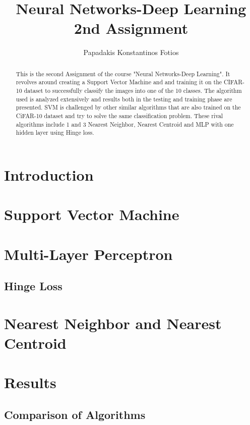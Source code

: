 \documentclass[lettersize,journal]{IEEEtran}
\begin{document}
\title{Neural Networks-Deep Learning \\ 2nd Assignment}
\author{Papadakis Konstantinos Fotios}
\maketitle

\begin{abstract}
This is the second Assignment of the course "Neural Networks-Deep Learning". It revolves around
creating a Support Vector Machine and and training it on the CIFAR-10 dataset to successfully 
classify the images into one of the 10 classes. The algorithm used is analyzed extensively and
results both in the testing and training phase are presented. SVM is challenged by other similar
algorithms that are also trained on the CiFAR-10 dataset and try to solve the same classification 
problem. These rival algorithms include 1 and 3 Nearest Neighbor, Nearest Centroid and MLP with
one hidden layer using Hinge loss.
\end{abstract}

\section{Introduction}
 

\section{Support Vector Machine}


\section{Multi-Layer Perceptron}

\subsection{}
\subsection{Hinge Loss}

\section{Nearest Neighbor and Nearest Centroid}


\section{Results}
\subsection{Comparison of Algorithms}


\vfill
\end{document}
